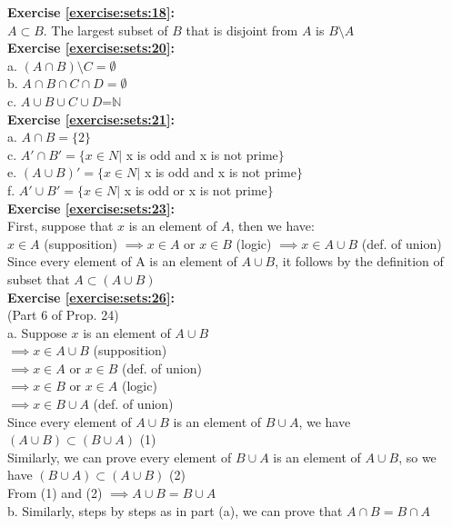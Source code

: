 \noindent\textbf{Exercise \ref{exercise:sets:18}:}\\
$A\subset B$. The largest subset of $B$ that is disjoint from $A$ is $B\setminus A$\\

\noindent\textbf{Exercise \ref{exercise:sets:20}:}\\
a. $(A\cap B)\setminus C=\emptyset$\\
b. $A\cap B\cap C\cap D=\emptyset$\\
c. $A \cup B \cup C \cup D$=$\mathbb{N}$\\

\noindent\textbf{Exercise \ref{exercise:sets:21}:}\\
a. $A\cap B=\{2\}$\\
c. $A'\cap B'=\{x\in N|$ x is odd and x is not prime$\}$\\
e. $(A\cup B)'=\{x\in N|$ x is odd and x is not prime$\}$\\
f. $A'\cup B'=\{x\in N|$ x is odd or x is not prime$\}$\\

\noindent\textbf{Exercise \ref{exercise:sets:23}:}\\
First, suppose that $x$ is an element of $A$, then we have:\\
$x\in A$ (supposition) $\implies x\in A$ or $x\in B$ (logic) $\implies x\in A\cup B$ (def. of union)\\
Since every element of A is an element of $A\cup B$, it follows by the definition of subset that $A\subset (A\cup B)$\\


\noindent\textbf{Exercise \ref{exercise:sets:26}:}\\
(Part 6 of Prop. 24)\\
a. Suppose $x$ is an element of $A\cup B$\\
$\implies x\in A\cup B$ (supposition)\\
$\implies x\in A$ or $x\in B$ (def. of union)\\
$\implies x\in B$ or $x\in A$ (logic)\\
$\implies x\in B\cup A$ (def. of union)\\
Since every element of $A\cup B$ is an element of $B\cup A$, we have $(A\cup B)\subset(B\cup A)$ (1)\\
Similarly, we can prove every element of $B\cup A$ is an element of $A\cup B$, so we have $(B\cup A)\subset (A\cup B)$ (2)\\
From (1) and (2) $\implies A\cup B = B\cup A$\\
b. Similarly, steps by steps as in part (a), we can prove that $A\cap B=B\cap A$\\

